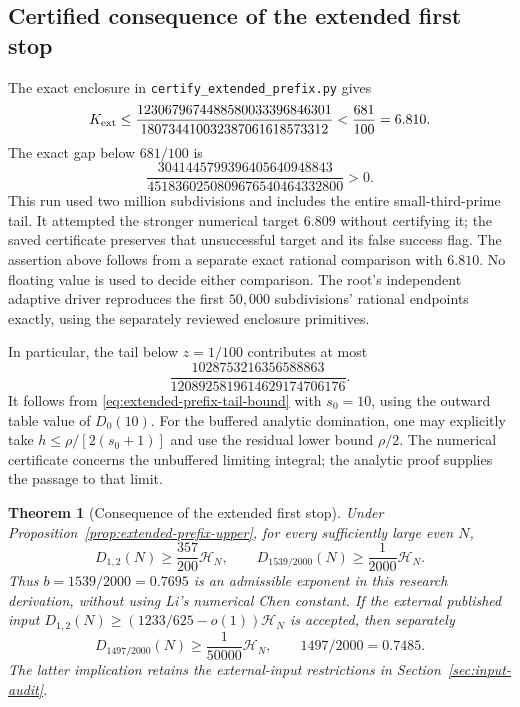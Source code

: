 \documentclass[11pt]{article}
\newtheorem{theorem}{Theorem}
\newcommand{\HN}{\mathcal H_N}
\begin{document}
\subsection{Certified consequence of the extended first stop}
\label{sec:extended-prefix-corollary}
The exact enclosure in \texttt{certify\_extended\_prefix.py} gives
\[
 K_{\rm ext}\le
 \frac{1230679674488580033396846301}{180734410032387061618573312}
 <\frac{681}{100}=6.810.
\]
The exact gap below $681/100$ is
\[
 \frac{3041445799396405640948843}{4518360250809676540464332800}>0.
\]
This run used two million subdivisions and includes the entire
small-third-prime tail. It attempted the stronger numerical target
$6.809$ without certifying it; the saved certificate preserves
that unsuccessful target and its false success flag. The assertion
above follows from a separate exact rational comparison with
$6.810$. No floating value is used to decide either comparison.
The root's independent adaptive driver reproduces the first
$50{,}000$ subdivisions' rational endpoints exactly, using the
separately reviewed enclosure primitives.

In particular, the tail below $z=1/100$ contributes at most
\[
 \frac{1028753216356588863}{1208925819614629174706176}.
\]
It follows from \eqref{eq:extended-prefix-tail-bound} with
$s_0=10$, using the outward table value of $D_0(10)$.
For the buffered analytic domination, one may explicitly take
$h\le\rho/[2(s_0+1)]$ and use the residual lower bound $\rho/2$.
The numerical certificate concerns the unbuffered limiting
integral; the analytic proof supplies the passage to that limit.

\begin{theorem}[Consequence of the extended first stop]
\label{thm:extended-prefix-chen}
Under Proposition~\ref{prop:extended-prefix-upper}, for every
sufficiently large even $N$,
\[
 D_{1,2}(N)\ge\frac{357}{200}\HN,
 \qquad D_{1539/2000}(N)\ge\frac1{2000}\HN.
\]
Thus $b=1539/2000=0.7695$ is an admissible exponent in this
research derivation, without using Li's numerical Chen constant.
If the external published input
$D_{1,2}(N)\ge(1233/625-o(1))\HN$ is accepted, then separately
\[
 D_{1497/2000}(N)\ge\frac1{50000}\HN,
 \qquad 1497/2000=0.7485.
\]
The latter implication retains the external-input restrictions in
Section~\ref{sec:input-audit}.
\end{theorem}
\end{document}
